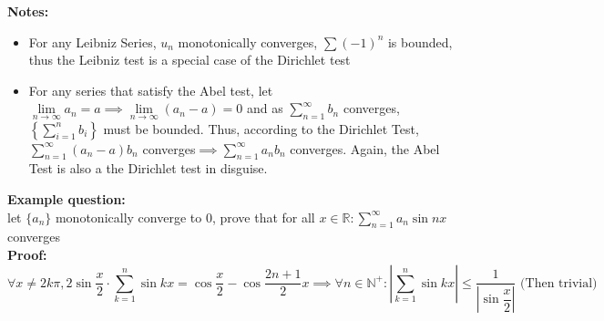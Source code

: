 \documentclass{article}
\newcommand{\0}{{\bf{0}}}
\begin{document}
\textbf{Notes:}
\begin{itemize}
    \item For any Leibniz Series, $u_n$ monotonically converges, $\sum(-1)^n$ is bounded, thus the Leibniz test is a special case of the Dirichlet test
    \item For any series that satisfy the Abel test, let $\lim\limits_{n\to\infty}a_n=a\implies\lim\limits_{n\to\infty}(a_n-a)=0$ and as $\sum\limits_{n=1}^\infty b_n$ converges, $\left\{\sum\limits_{i=1}^nb_i\right\}$ must be bounded. Thus, according to the Dirichlet Test, $\sum\limits_{n=1}^\infty(a_n-a)b_n$ converges$\implies\sum\limits_{n=1}^\infty a_nb_n$ converges. Again, the Abel Test is also a the Dirichlet test in disguise.
\end{itemize}
\textbf{Example question:}\\
let $\{a_n\}$ monotonically converge to 0, prove that for all
$x\in\mathbb{R}:\sum\limits_{n=1}^\infty a_n\sin nx$ converges\\
\textbf{Proof:}
$$\forall x\neq2k\pi,2\sin\frac{x}{2}\cdot\sum_{k=1}^n\sin kx=\cos\frac{x}{2}-\cos\frac{2n+1}{2}x\implies\forall n\in\mathbb{N}^+:\left|\sum_{k=1}^n\sin kx\right|\le\frac{1}{\left|\sin\dfrac{x}{2}\right|}\mbox{ (Then trivial)}$$
\end{document}
